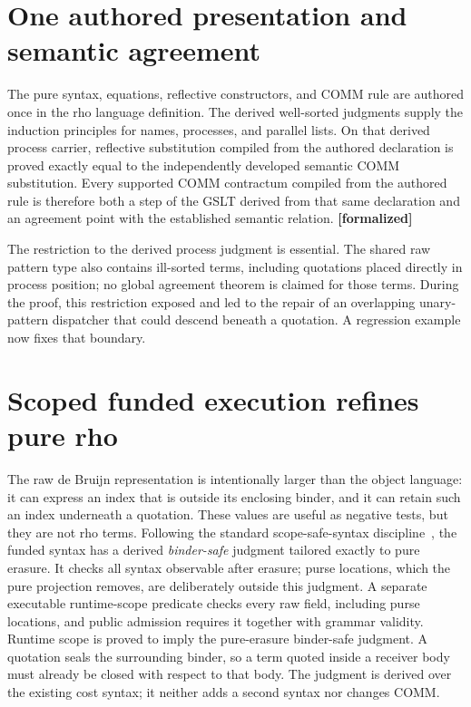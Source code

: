\documentclass[11pt]{article}
\newcommand{\formalized}{\textbf{[formalized]}}
\begin{document}
\section{One authored presentation and semantic agreement}
\label{sec:authored}

The pure syntax, equations, reflective constructors, and COMM rule are authored
once in the rho language definition.  The derived well-sorted judgments supply
the induction principles for names, processes, and parallel lists.  On that
derived process carrier, reflective substitution compiled from the authored
declaration is proved exactly equal to the independently developed semantic
COMM substitution.  Every supported COMM contractum compiled from the authored
rule is therefore both a step of the GSLT derived from that same declaration
and an agreement point with the established semantic relation. \formalized{}

The restriction to the derived process judgment is essential.  The shared raw
pattern type also contains ill-sorted terms, including quotations placed
directly in process position; no global agreement theorem is claimed for those
terms.  During the proof, this restriction exposed and led to the repair of an
overlapping unary-pattern dispatcher that could descend beneath a quotation.
A regression example now fixes that boundary.

\section{Scoped funded execution refines pure rho}
\label{sec:scoped-refinement}

The raw de Bruijn representation is intentionally larger than the object
language: it can express an index that is outside its enclosing binder, and it
can retain such an index underneath a quotation.  These values are useful as
negative tests, but they are not rho terms.  Following the standard
scope-safe-syntax discipline~\cite{allais-scope-safe}, the funded syntax has a
derived \emph{binder-safe} judgment tailored exactly to pure erasure.  It checks
all syntax observable after erasure; purse locations, which the pure projection
removes, are deliberately outside this judgment.  A separate executable
runtime-scope predicate checks every raw field, including purse locations, and
public admission requires it together with grammar validity.  Runtime scope is
proved to imply the pure-erasure binder-safe judgment.  A quotation
seals the surrounding binder,
so a term quoted inside a receiver body must already be closed with respect to
that body.  The judgment is derived over the existing cost syntax; it neither
adds a second syntax nor changes COMM.
\end{document}

